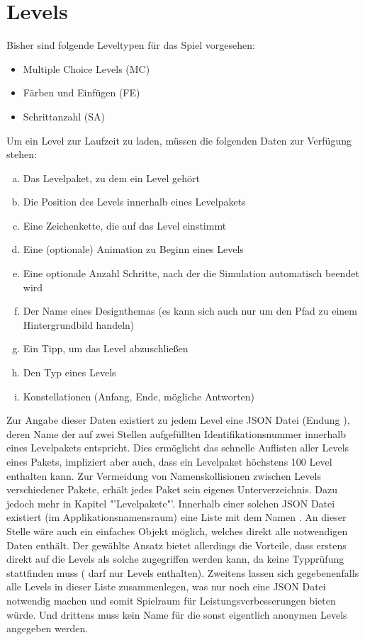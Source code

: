 \section{Levels}
Bisher sind folgende Leveltypen für das Spiel vorgesehen:
\begin{itemize}
	\item Multiple Choice Levels (MC)
	\item Färben und Einfügen (FE)
	\item Schrittanzahl (SA)
\end{itemize}
Um ein Level zur Laufzeit zu laden, müssen die folgenden Daten zur Verfügung stehen:
\begin{enumerate}[a)]
	\item Das Levelpaket, zu dem ein Level gehört
	\item Die Position des Levels innerhalb eines Levelpakets
	\item Eine Zeichenkette, die auf das Level einstimmt
	\item Eine (optionale) Animation zu Beginn eines Levels
	\item Eine optionale Anzahl Schritte, nach der die Simulation automatisch beendet wird
	\item Der Name eines Designthemas (es kann sich auch nur um den Pfad zu einem Hintergrundbild handeln)
	\item Ein Tipp, um das Level abzuschließen
	\item Den Typ eines Levels
	\item Konstellationen (Anfang, Ende, mögliche Antworten)
\end{enumerate}
Zur Angabe dieser Daten existiert zu jedem Level eine JSON Datei (Endung ), deren Name der auf zwei Stellen aufgefüllten Identifikationsnummer innerhalb eines Levelpakets entspricht.
Dies ermöglicht das schnelle Auflisten aller Levels eines Pakets, impliziert aber auch, dass ein Levelpaket höchstens 100 Level enthalten kann.
Zur Vermeidung von Namenskollisionen zwischen Levels verschiedener Pakete, erhält jedes Paket sein eigenes Unterverzeichnis.
Dazu jedoch mehr in Kapitel "'Levelpakete"'.
Innerhalb einer solchen JSON Datei existiert (im Applikationsnamensraum) eine Liste mit dem Namen .
An dieser Stelle wäre auch ein einfaches Objekt möglich, welches direkt alle notwendigen Daten enthält.
Der gewählte Ansatz bietet allerdings die Vorteile, dass erstens direkt auf die Levels als solche zugegriffen werden kann, da keine Typprüfung stattfinden muss ( darf nur Levels enthalten).
Zweitens lassen sich gegebenenfalls alle Levels in dieser Liste zusammenlegen, was nur noch eine JSON Datei notwendig machen und somit Spielraum für Leistungsverbesserungen bieten würde.
Und drittens muss kein Name für die sonst eigentlich anonymen Levels angegeben werden.


